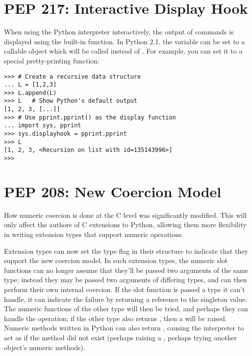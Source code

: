 \documentclass{howto}
\begin{document}
\section{PEP 217: Interactive Display Hook}

When using the Python interpreter interactively, the output of
commands is displayed using the built-in  function.
In Python 2.1, the variable  can be set to a
callable object which will be called instead of .
For example, you can set it to a special pretty-printing function:

\begin{verbatim}
>>> # Create a recursive data structure
... L = [1,2,3]
>>> L.append(L)
>>> L   # Show Python's default output
[1, 2, 3, [...]]
>>> # Use pprint.pprint() as the display function
... import sys, pprint
>>> sys.displayhook = pprint.pprint
>>> L
[1, 2, 3, <Recursion on list with id=135143996>]
>>> 
\end{verbatim}

\begin{seealso}


\end{seealso}

\section{PEP 208: New Coercion Model}

How numeric coercion is done at the C level was significantly
modified.  This will only affect the authors of C extensions to
Python, allowing them more flexibility in writing extension types that
support numeric operations.

Extension types can now set the type flag
 in their 
structure to indicate that they support the new coercion model.  In
such extension types, the numeric slot functions can no longer assume
that they'll be passed two arguments of the same type; instead they
may be passed two arguments of differing types, and can then perform
their own internal coercion.  If the slot function is passed a type it
can't handle, it can indicate the failure by returning a reference to
the  singleton value.  The numeric functions
of the other type will then be tried, and perhaps they can handle the
operation; if the other type also returns ,
then a  will be raised.  Numeric methods written
in Python can also return , causing the
interpreter to act as if the method did not exist (perhaps raising a
, perhaps trying another object's numeric
methods).
\end{document}
